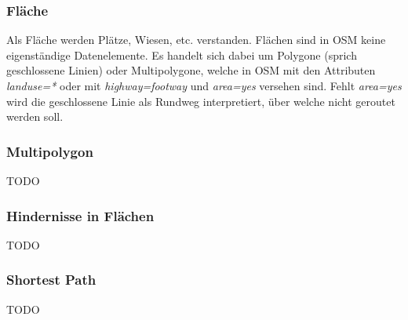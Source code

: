 
\subsubsection{Fläche}
\label{Fläche}

Als Fläche werden Plätze, Wiesen, etc. verstanden. Flächen sind in \ac{OSM} keine eigenständige Datenelemente. Es handelt sich dabei um Polygone (sprich geschlossene Linien) oder Multipolygone, welche in \ac{OSM} mit den Attributen \textit{landuse=*} oder mit \textit{highway=footway} und \textit{area=yes} versehen sind. Fehlt \textit{area=yes} wird die geschlossene Linie als Rundweg interpretiert, über welche nicht geroutet werden soll.


\subsubsection{Multipolygon}
\label{Multipolygon}

TODO

\subsubsection{Hindernisse in Flächen}
\label{Hindernisse in Flächen}

TODO %


\subsubsection{Shortest Path}
\label{Shortest Path}

TODO
